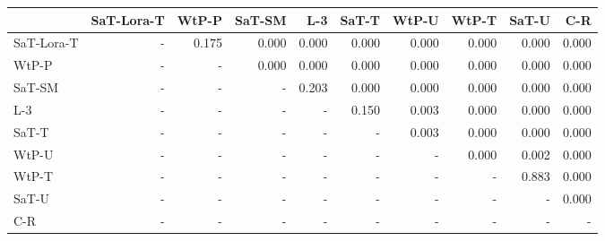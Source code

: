 \begin{tabular}{lrrrrrrrrr}
\toprule
 & SaT-Lora-T & WtP-P & SaT-SM & L-3 & SaT-T & WtP-U & WtP-T & SaT-U & C-R \\
\midrule
SaT-Lora-T & - & 0.175 & 0.000 & 0.000 & 0.000 & 0.000 & 0.000 & 0.000 & 0.000 \\
WtP-P & - & - & 0.000 & 0.000 & 0.000 & 0.000 & 0.000 & 0.000 & 0.000 \\
SaT-SM & - & - & - & 0.203 & 0.000 & 0.000 & 0.000 & 0.000 & 0.000 \\
L-3 & - & - & - & - & 0.150 & 0.003 & 0.000 & 0.000 & 0.000 \\
SaT-T & - & - & - & - & - & 0.003 & 0.000 & 0.000 & 0.000 \\
WtP-U & - & - & - & - & - & - & 0.000 & 0.002 & 0.000 \\
WtP-T & - & - & - & - & - & - & - & 0.883 & 0.000 \\
SaT-U & - & - & - & - & - & - & - & - & 0.000 \\
C-R & - & - & - & - & - & - & - & - & - \\
\bottomrule
\end{tabular}

